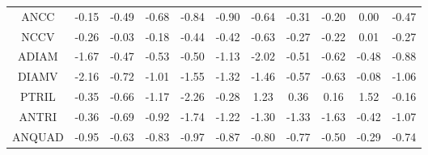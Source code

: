\documentclass[11pt,a4paper]{report}
\begin{document}
\begin{longtable}{ | c || c | c | c | c | c | c | c | c | c || c |}
ANCC &  \cellcolor[HTML]{FFFFFF} -0.15 &  \cellcolor[HTML]{FFEFEF} -0.49 &  \cellcolor[HTML]{FFEFEF} -0.68 &  \cellcolor[HTML]{FFE7E7} -0.84 &  \cellcolor[HTML]{FFE7E7} -0.90 &  \cellcolor[HTML]{FFEFEF} -0.64 &  \cellcolor[HTML]{FFF7F7} -0.31 &  \cellcolor[HTML]{FFF7F7} -0.20 &  \cellcolor[HTML]{FFFFFF} 0.00 &  \cellcolor[HTML]{FFF7F7} -0.47 \\
NCCV &  \cellcolor[HTML]{FFF7F7} -0.26 &  \cellcolor[HTML]{FFFFFF} -0.03 &  \cellcolor[HTML]{FFF7F7} -0.18 &  \cellcolor[HTML]{FFF7F7} -0.44 &  \cellcolor[HTML]{FFF7F7} -0.42 &  \cellcolor[HTML]{FFEFEF} -0.63 &  \cellcolor[HTML]{FFF7F7} -0.27 &  \cellcolor[HTML]{FFF7F7} -0.22 &  \cellcolor[HTML]{FFFFFF} 0.01 &  \cellcolor[HTML]{FFF7F7} -0.27 \\
ADIAM &  \cellcolor[HTML]{FFD7D7} -1.67 &  \cellcolor[HTML]{FFF7F7} -0.47 &  \cellcolor[HTML]{FFEFEF} -0.53 &  \cellcolor[HTML]{FFEFEF} -0.50 &  \cellcolor[HTML]{FFDFDF} -1.13 &  \cellcolor[HTML]{FFCFCF} -2.02 &  \cellcolor[HTML]{FFEFEF} -0.51 &  \cellcolor[HTML]{FFEFEF} -0.62 &  \cellcolor[HTML]{FFEFEF} -0.48 &  \cellcolor[HTML]{FFE7E7} -0.88 \\
DIAMV &  \cellcolor[HTML]{FFC7C7} -2.16 &  \cellcolor[HTML]{FFEFEF} -0.72 &  \cellcolor[HTML]{FFE7E7} -1.01 &  \cellcolor[HTML]{FFD7D7} -1.55 &  \cellcolor[HTML]{FFDFDF} -1.32 &  \cellcolor[HTML]{FFD7D7} -1.46 &  \cellcolor[HTML]{FFEFEF} -0.57 &  \cellcolor[HTML]{FFEFEF} -0.63 &  \cellcolor[HTML]{FFFFFF} -0.08 &  \cellcolor[HTML]{FFE7E7} -1.06 \\
PTRIL &  \cellcolor[HTML]{FFF7F7} -0.35 &  \cellcolor[HTML]{FFEFEF} -0.66 &  \cellcolor[HTML]{FFDFDF} -1.17 &  \cellcolor[HTML]{FFC7C7} -2.26 &  \cellcolor[HTML]{FFF7F7} -0.28 &  \cellcolor[HTML]{DFDFFF} 1.23 &  \cellcolor[HTML]{F7F7FF} 0.36 &  \cellcolor[HTML]{F7F7FF} 0.16 &  \cellcolor[HTML]{D7D7FF} 1.52 &  \cellcolor[HTML]{FFF7F7} -0.16 \\
ANTRI &  \cellcolor[HTML]{FFF7F7} -0.36 &  \cellcolor[HTML]{FFEFEF} -0.69 &  \cellcolor[HTML]{FFE7E7} -0.92 &  \cellcolor[HTML]{FFD7D7} -1.74 &  \cellcolor[HTML]{FFDFDF} -1.22 &  \cellcolor[HTML]{FFDFDF} -1.30 &  \cellcolor[HTML]{FFDFDF} -1.33 &  \cellcolor[HTML]{FFD7D7} -1.63 &  \cellcolor[HTML]{FFF7F7} -0.42 &  \cellcolor[HTML]{FFE7E7} -1.07 \\
ANQUAD &  \cellcolor[HTML]{FFE7E7} -0.95 &  \cellcolor[HTML]{FFEFEF} -0.63 &  \cellcolor[HTML]{FFE7E7} -0.83 &  \cellcolor[HTML]{FFE7E7} -0.97 &  \cellcolor[HTML]{FFE7E7} -0.87 &  \cellcolor[HTML]{FFE7E7} -0.80 &  \cellcolor[HTML]{FFEFEF} -0.77 &  \cellcolor[HTML]{FFEFEF} -0.50 &  \cellcolor[HTML]{FFF7F7} -0.29 &  \cellcolor[HTML]{FFEFEF} -0.74 \\

\end{longtable}
\end{document}
